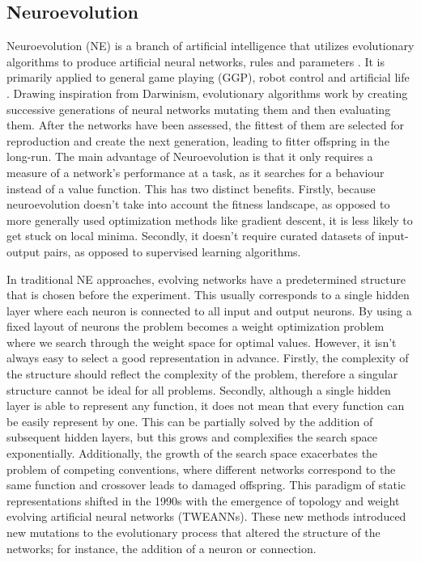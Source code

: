 \documentclass[letterpaper, 12pt]{article}
\begin{document}
\subsection*{Neuroevolution}
Neuroevolution (NE) is a branch of artificial intelligence that utilizes evolutionary
algorithms to produce artificial neural networks, rules and parameters \cite{neuro19}.
It is primarily applied to general game playing (GGP), robot control and artificial life
\cite{neurogames}. Drawing inspiration from Darwinism, evolutionary algorithms work by
creating successive generations of neural networks mutating them and then evaluating
them. After the networks have been assessed, the fittest of them are selected for
reproduction and create the next generation, leading to fitter offspring in the
long-run. The main advantage of Neuroevolution is that it only requires a measure of a
network's performance at a task, as it searches for a behaviour instead of a value
function. This has two distinct benefits. Firstly, because neuroevolution doesn't take
into account the fitness landscape, as opposed to more generally used optimization
methods like gradient descent, it is less likely to get stuck on local minima. Secondly,
it doesn't require curated datasets of input-output pairs, as opposed to supervised
learning algorithms.

In traditional NE approaches, evolving networks have a predetermined structure that is
chosen before the experiment. This usually corresponds to a single hidden layer where
each neuron is connected to all input and output neurons. By using a fixed layout of
neurons the problem becomes a weight optimization problem where we search through the
weight space for optimal values. However, it isn't always easy to select a good
representation in advance. Firstly, the complexity of the structure should reflect the
complexity of the problem, therefore a singular structure cannot be ideal for all
problems. Secondly, although a single hidden layer is able to represent any function, it
does not mean that every function can be easily represent by one. This can be partially
solved by the addition of subsequent hidden layers, but this grows and complexifies the
search space exponentially. Additionally, the growth of the search space exacerbates the
problem of competing conventions, where different networks correspond to the same
function and crossover leads to damaged offspring. This paradigm of static
representations shifted in the 1990s with the emergence of topology and weight evolving
artificial neural networks (TWEANNs). These new methods introduced new mutations to the
evolutionary process that altered the structure of the networks; for instance, the
addition of a neuron or connection.
\end{document}
